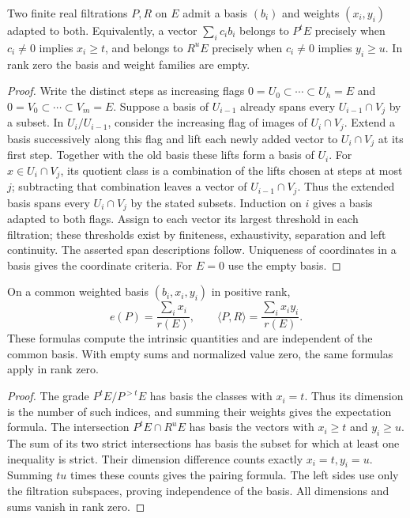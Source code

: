 \begin{lemma}
\label{lem:common-weighted-filtration-basis}
\leanok
Two finite real filtrations $P,R$ on $E$ admit a basis $(b_i)$ and
weights $(x_i,y_i)$ adapted to both. Equivalently, a vector
$\sum_i c_i b_i$ belongs to $P^tE$ precisely when $c_i\ne0$ implies
$x_i\ge t$, and belongs to $R^uE$ precisely when $c_i\ne0$ implies
$y_i\ge u$. In rank zero the basis and weight families are empty.
\end{lemma}
\begin{proof}
Write the distinct steps as increasing flags
$0=U_0\subset\cdots\subset U_h=E$ and
$0=V_0\subset\cdots\subset V_m=E$.
Suppose a basis of $U_{i-1}$ already spans every $U_{i-1}\cap V_j$
by a subset. In $U_i/U_{i-1}$, consider the increasing flag of images
of $U_i\cap V_j$. Extend a basis successively along this flag and
lift each newly added vector to $U_i\cap V_j$ at its first step.
Together with the old basis these lifts form a basis of $U_i$.
For $x\in U_i\cap V_j$, its quotient class is a combination of the
lifts chosen at steps at most $j$; subtracting that combination leaves
a vector of $U_{i-1}\cap V_j$. Thus the extended basis spans every
$U_i\cap V_j$ by the stated subsets. Induction on $i$ gives a basis
adapted to both flags. Assign to each vector its largest threshold
in each filtration; these thresholds exist by finiteness, exhaustivity,
separation and left continuity. The asserted span descriptions follow.
Uniqueness of coordinates in a basis gives the coordinate criteria.
For $E=0$ use the empty basis.
\end{proof}

\begin{lemma}
\label{lem:filtration-weight-formulas}
\leanok
On a common weighted basis $(b_i,x_i,y_i)$ in positive rank,
\[
 e(P)=\frac{\sum_i x_i}{r(E)},\qquad
 \langle P,R\rangle=\frac{\sum_i x_i y_i}{r(E)}.
\]
These formulas compute the intrinsic quantities and are independent
of the common basis. With empty sums and normalized value zero,
the same formulas apply in rank zero.
\end{lemma}
\begin{proof}
The grade $P^tE/P^{>t}E$ has basis the classes with $x_i=t$.
Thus its dimension is the number of such indices, and summing their
weights gives the expectation formula. The intersection $P^tE\cap R^uE$
has basis the vectors with $x_i\ge t$ and $y_i\ge u$. The sum of its
two strict intersections has basis the subset for which at least one
inequality is strict. Their dimension difference counts exactly
$x_i=t,y_i=u$. Summing $tu$ times these counts gives the pairing
formula. The left sides use only the filtration subspaces, proving
independence of the basis. All dimensions and sums vanish in rank zero.
\end{proof}

